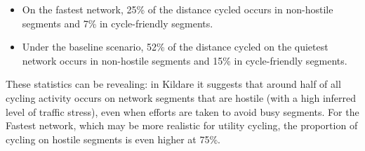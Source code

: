 \documentclass[
  super,
  preprint,
  3p]{elsarticle}
\begin{document}
\begin{itemize}
\item
  On the fastest network, 25\% of the distance cycled occurs in
  non-hostile segments and 7\% in cycle-friendly segments.
\item
  Under the baseline scenario, 52\% of the distance cycled on the
  quietest network occurs in non-hostile segments and 15\% in
  cycle-friendly segments.
\end{itemize}

These statistics can be revealing: in Kildare it suggests that around
half of all cycling activity occurs on network segments that are hostile
(with a high inferred level of traffic stress), even when efforts are
taken to avoid busy segments. For the Fastest network, which may be more
realistic for utility cycling, the proportion of cycling on hostile
segments is even higher at 75\%.
\end{document}
